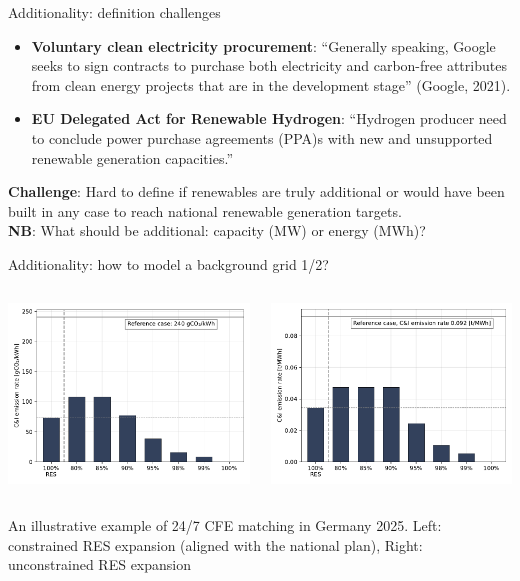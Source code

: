 \begin{frame}{Additionality: definition challenges}

\begin{itemize}
	\item \textbf{Voluntary clean electricity procurement}: \enquote{Generally speaking, Google seeks to sign contracts to purchase both electricity and carbon-free attributes from clean energy projects that are in the development stage} (Google, 2021).
	\item \textbf{EU Delegated Act for Renewable Hydrogen}: \enquote{Hydrogen producer need to conclude power purchase agreements (PPA)s with new and unsupported renewable generation capacities.} 
\end{itemize}
\textbf{Challenge}: Hard to define if renewables are truly additional or would have been built in any case to reach national renewable generation targets.\\
\textbf{NB}: What should be additional: capacity (MW) or energy (MWh)?
\end{frame}


\begin{frame}{Additionality: how to model a background grid 1/2?}

  \begin{columns}
    \begin{column}{7cm}
      \includegraphics[width=7.5cm]{images/10-2025-DE-p3-ci_emisrate.pdf}
    \end{column}
    \begin{column}{7cm}
      \includegraphics[width=7.5cm]{images/ci_emisrate.pdf}
    \end{column}
  \end{columns}
An illustrative example of 24/7 CFE matching in Germany 2025. Left: constrained RES expansion (aligned with the national plan), Right: unconstrained RES expansion 
\end{frame}


